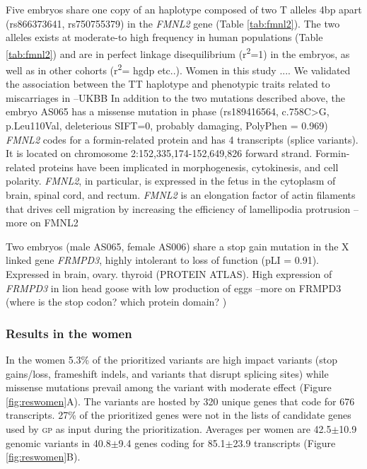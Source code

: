 \documentclass[fleqn,10pt]{wlscirep}
\newcommand{\gp}[]{\textsc{gp }}
\begin{document}
Five embryos share one copy of an haplotype composed of two T alleles 4bp apart (rs866373641, rs750755379) in the \textit{FMNL2} gene (Table \ref{tab:fmnl2}). The two alleles exists at moderate-to high frequency in human populations (Table \ref{tab:fmnl2}) and are in perfect linkage disequilibrium (r\textsuperscript{2}=1) in the embryos, as well as in other cohorts (r\textsuperscript{2}= hgdp etc..). Women in this study .... 
We validated the association between the TT haplotype and phenotypic traits related to miscarriages in --UKBB 
In addition to the two mutations described above, the embryo AS065 has a missense mutation in phase (rs189416564, c.758C>G, p.Leu110Val, deleterious SIFT=0, probably damaging, PolyPhen = 0.969) 
\textit{FMNL2} codes for a formin-related protein and has 4 transcripts (splice variants). It is located on chromosome 2:152,335,174-152,649,826 forward strand. Formin-related proteins have been implicated in morphogenesis, cytokinesis, and cell polarity. \textit{FMNL2}, in particular, is expressed in the fetus in the cytoplasm of brain, spinal cord, and rectum\cite{lizio2015gateways}. \textit{FMNL2} is an elongation factor of actin filaments that drives cell migration by increasing the efficiency of lamellipodia protrusion \cite{block2012fmnl2} --more on FMNL2

Two embryos (male AS065, female AS006) share a stop gain mutation in the X linked gene \textit{FRMPD3}, highly intolerant to loss of function (pLI = 0.91). Expressed in brain, ovary. thyroid (PROTEIN ATLAS). High expression of \textit{FRMPD3} in lion head goose with low production of eggs \cite{zhao2020genome} --more on FRMPD3 (where is the stop codon? which protein domain? )


\subsubsection*{Results in the women} 
In the women 5.3\% of the prioritized variants are  high impact variants (stop gains/loss, frameshift indels, and variants that disrupt splicing sites) while missense mutations prevail among the variant with moderate effect (Figure \ref{fig:reswomen}A). The variants are hosted by 320 unique genes that code for 676 transcripts. 27\% of the prioritized genes were not in the lists of candidate genes used by \gp as input during the prioritization. Averages per women  are 42.5$\pm$10.9 genomic variants in 40.8$\pm$9.4 genes coding for 85.1$\pm$23.9 transcripts (Figure \ref{fig:reswomen}B). 
\end{document}
